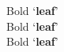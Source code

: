 \documentclass{article}
\begin{document}
	\noindent 
	Bold `{\bfseries leaf}'\\
	Bold `{\bfseries leaf\/}'\\
	Bold `\textbf{leaf}'\\
\end{document}
